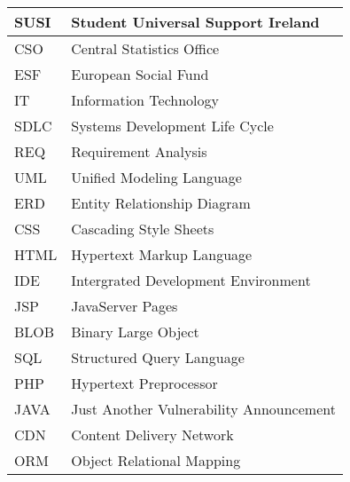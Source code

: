 



\begin{longtable}{p{90pt}l}
\hline SUSI	& Student Universal Support Ireland \\
\hline CSO	& Central Statistics Office \\
\hline ESF		& European Social Fund \\
\hline IT		& Information Technology \\
\hline SDLC      & Systems Development Life Cycle \\
\hline REQ	& Requirement Analysis \\
\hline UML	& Unified Modeling Language \\
\hline ERD	& Entity Relationship Diagram \\
\hline CSS	& Cascading Style Sheets \\
\hline HTML      & Hypertext Markup Language \\
\hline IDE		& Intergrated Development Environment \\
\hline JSP		& JavaServer Pages \\
\hline BLOB	& Binary Large Object \\
\hline SQL		& Structured Query Language \\
\hline PHP      	& Hypertext Preprocessor \\
\hline JAVA     	& Just Another Vulnerability Announcement \\
\hline CDN      	& Content Delivery Network \\
\hline ORM      	& Object Relational Mapping \\
\hline
\end{longtable}






